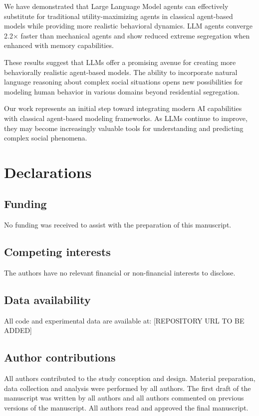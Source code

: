 \documentclass[pdflatex,sn-basic]{sn-jnl}%
\theoremstyle{thmstyleone}%
\theoremstyle{thmstyletwo}%
\theoremstyle{thmstylethree}%
\begin{document}
We have demonstrated that Large Language Model agents can effectively substitute for traditional utility-maximizing agents in classical agent-based models while providing more realistic behavioral dynamics. LLM agents converge 2.2× faster than mechanical agents and show reduced extreme segregation when enhanced with memory capabilities.

These results suggest that LLMs offer a promising avenue for creating more behaviorally realistic agent-based models. The ability to incorporate natural language reasoning about complex social situations opens new possibilities for modeling human behavior in various domains beyond residential segregation.

Our work represents an initial step toward integrating modern AI capabilities with classical agent-based modeling frameworks. As LLMs continue to improve, they may become increasingly valuable tools for understanding and predicting complex social phenomena.

\section*{Declarations}

\subsection*{Funding}
No funding was received to assist with the preparation of this manuscript.

\subsection*{Competing interests}
The authors have no relevant financial or non-financial interests to disclose.

\subsection*{Data availability}
All code and experimental data are available at: [REPOSITORY URL TO BE ADDED]

\subsection*{Author contributions}
All authors contributed to the study conception and design. Material preparation, data collection and analysis were performed by all authors. The first draft of the manuscript was written by all authors and all authors commented on previous versions of the manuscript. All authors read and approved the final manuscript.


\end{document}
